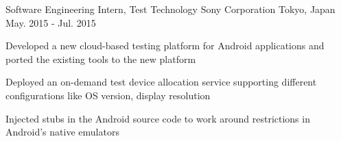 \begin{cventries}
  \cventry
    {Software Engineering Intern, Test Technology} %
    {Sony Corporation} %
    {Tokyo, Japan} %
    {May. 2015 - Jul. 2015} %
    {
      \begin{cvitems} %
        \item {Developed a new cloud-based testing platform for Android applications and ported the existing tools to the new platform}
        \item {Deployed an on-demand test device allocation service supporting different configurations like OS version, display resolution}
        \item {Injected stubs in the Android source code to work around restrictions in Android’s native emulators}
      \end{cvitems}
    }

\end{cventries}
